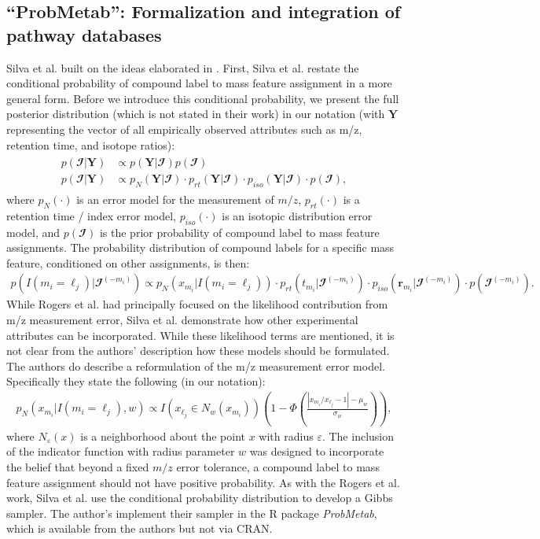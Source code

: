 \begin{DoubleSpace*}
\section{``ProbMetab'': Formalization and integration of pathway databases}
Silva et al. \cite{silva2014} built on the ideas elaborated in \cite{rogers2009}. First, Silva et al. restate the conditional probability of compound label to mass feature assignment in a more general form. Before we introduce this conditional probability, we present the full posterior distribution (which is not stated in their work) in our notation (with $\textbf{Y}$ representing the vector of all empirically observed attributes such as m/z, retention time, and isotope ratios):
\begin{align}
\begin{split}
p( \mathbfcal{I}|\textbf{Y}) & \propto p(\textbf{Y}| \mathbfcal{I}) p( \mathbfcal{I}) \\
p(\mathbfcal{I}|\textbf{Y}) & \propto p_N(\textbf{Y}|\mathbfcal{I}) \cdot p_{rt}(\textbf{Y}|\mathbfcal{I}) \cdot p_{iso}(\textbf{Y}|\mathbfcal{I}) \cdot p( \mathbfcal{I}),
\end{split}
\end{align}
where $p_N(\cdot)$ is an error model for the measurement of $m/z$, $p_{rt}(\cdot)$ is a retention time / index error model, $p_{iso}(\cdot)$ is an isotopic distribution error model, and $p( \mathbfcal{I})$ is the prior probability of compound label to mass feature assignments. The probability distribution of compound labels for a specific mass feature, conditioned on other assignments, is then:
\begin{align}
p( I(m_i=\ell_j )| \mathbfcal{I}^{(-m_i)}) \propto p_N(x_{m_i}| I(m_i=\ell_j )) \cdot p_{rt}(t_{m_i}|\mathbfcal{I}^{(-m_i)}) \cdot p_{iso}(\textbf{r}_{m_i}|\mathbfcal{I}^{(-m_i)}) \cdot p( \mathbfcal{I}^{(-m_i)}).
\end{align}
While Rogers et al. \cite{rogers2009} had principally focused on the likelihood contribution from m/z measurement error, Silva et al. \cite{silva2014} demonstrate how other experimental attributes can be incorporated. While these likelihood terms are mentioned, it is not clear from the authors' description how these models should be formulated. The authors do describe a reformulation of the m/z measurement error model. Specifically they state the following (in our notation):
\begin{align}
p_N(x_{m_i}| I(m_i=\ell_j ),w) \propto I(x_{\ell_j}\in N_w(x_{m_i})) \left(1-\Phi\left(\frac{|x_{m_i}/x_{\ell_j}-1|-\mu_w}{\sigma_w}\right) \right),
\end{align}
where $N_\varepsilon(x)$ is a neighborhood about the point $x$ with radius $\varepsilon$. The inclusion of the indicator function with radius parameter $w$ was designed to incorporate the belief that beyond a fixed $m/z$ error tolerance, a compound label to mass feature assignment should not have positive probability. As with the Rogers et al. \cite{rogers2009} work, Silva et al. \cite{silva2014} use the conditional probability distribution to develop a Gibbs sampler. The author's implement their sampler in the R package \emph{ProbMetab}, which is available from the authors but not via CRAN.


\end{DoubleSpace*}
